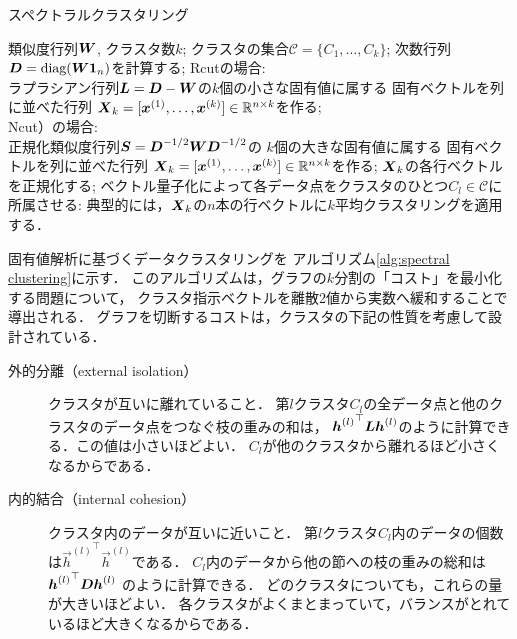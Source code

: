 
\begin{algorithm}[t]
\caption{スペクトラルクラスタリング}
\label{alg:spectral clustering}
\begin{algorithmic}[1]
\REQUIRE
類似度行列$\mbox{\boldmath $W$}$, クラスタ数$k$;
\ENSURE クラスタの集合$\mathcal{C}=\{ C_1,\dots,C_k \}$;
\STATE
次数行列$\mbox{\boldmath $D$}=\mathop{\textrm{diag}}\nolimits(\mbox{\boldmath $W$}\mbox{\boldmath $1$}_n)$を計算する;
\label{step:D}
\STATE
Rcut\cite{Hagen92}の場合: \\
ラプラシアン行列$\mbox{\boldmath $L$}=\mbox{\boldmath $D$}-\mbox{\boldmath $W$}$の$k$個の小さな固有値に属する
固有ベクトルを列に並べた行列
$\mbox{\boldmath $X$}_k=[\mbox{\boldmath $x$}^{(1)},\dots,\mbox{\boldmath $x$}^{(k)}]\in\mathbb{R}^{n\times k}$を作る;\\
Ncut\cite{Shi00,Yu03}）の場合: \\
正規化類似度行列$\mbox{\boldmath $S$}=\mbox{\boldmath $D$}^{-1/2}\mbox{\boldmath $W$}\mbox{\boldmath $D$}^{-1/2}$の
$k$個の大きな固有値に属する
固有ベクトルを列に並べた行列
$\mbox{\boldmath $X$}_k=[\mbox{\boldmath $x$}^{(1)},\dots,\mbox{\boldmath $x$}^{(k)}]\in\mathbb{R}^{n\times k}$を作る;
\label{step:eigen}
\STATE
$\mbox{\boldmath $X$}_k$の各行ベクトルを正規化する;
\STATE
ベクトル量子化によって各データ点をクラスタのひとつ$C_l\in\mathcal{C}$に所属させる: 
典型的には，$\mbox{\boldmath $X$}_k$の$n$本の行ベクトルに$k$平均クラスタリングを適用する．
\end{algorithmic}
\end{algorithm}

固有値解析に基づくデータクラスタリングを
アルゴリズム\ref{alg:spectral clustering}に示す．
このアルゴリズムは，グラフの$k$分割の「コスト」を最小化する問題について，
クラスタ指示ベクトルを離散2値から実数へ緩和することで導出される．
グラフを切断するコストは，クラスタの下記の性質を考慮して設計されている．
\begin{description}
\item[外的分離（external isolation）]
クラスタが互いに離れていること．
第$l$クラスタ$C_l$の全データ点と他のクラスタのデータ点をつなぐ枝の重みの和は，
${\mbox{\boldmath $h$}^{(l)}}^\top\mbox{\boldmath $L$}\mbox{\boldmath $h$}^{(l)}$のように計算できる．この値は小さいほどよい．
$C_l$が他のクラスタから離れるほど小さくなるからである．
\item[内的結合（internal cohesion）]
クラスタ内のデータが互いに近いこと．
第$l$クラスタ$C_l$内のデータの個数は${\vec h^{(l)}}^\top\vec h^{(l)}$である．
$C_l$内のデータから他の節への枝の重みの総和は${\mbox{\boldmath $h$}^{(l)}}^\top\mbox{\boldmath $D$}\mbox{\boldmath $h$}^{(l)}$
のように計算できる．
どのクラスタについても，これらの量が大きいほどよい．
各クラスタがよくまとまっていて，バランスがとれているほど大きくなるからである．
\end{description}

